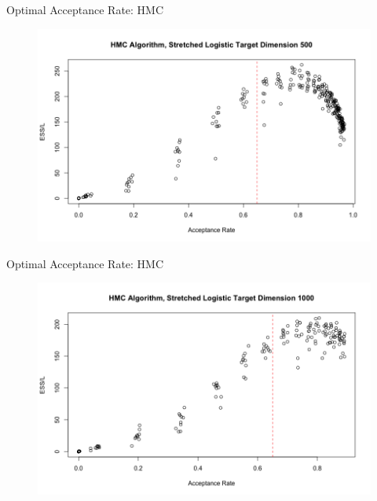 \documentclass{beamer}
\begin{document}
\begin{frame}{Optimal Acceptance Rate: HMC}
\begin{figure}
\centering
\includegraphics[scale = 0.3]{HMC_Optimal500.png}
\end{figure}
\end{frame}


\begin{frame}{Optimal Acceptance Rate: HMC}
\begin{figure}
\centering
\includegraphics[scale = 0.3]{HMC_Optimal1000.png}
\end{figure}
\end{frame}


\end{document}
